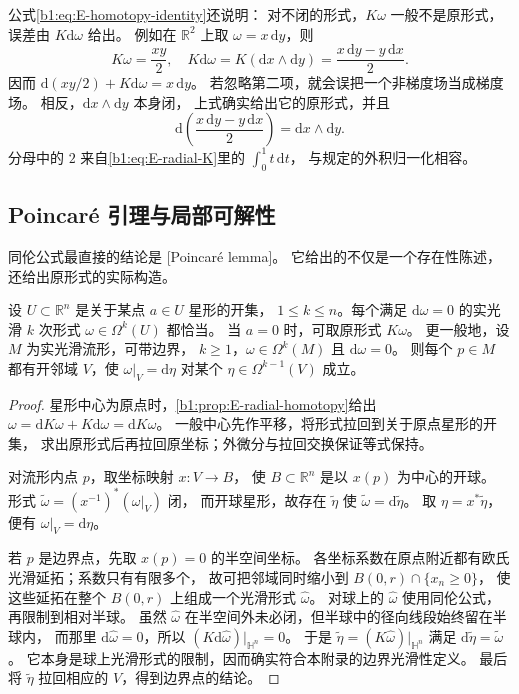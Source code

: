 公式\eqref{b1:eq:E-homotopy-identity}还说明：
对不闭的形式，\(K\omega\) 一般不是原形式，误差由 \(K\mathrm d\omega\) 给出。
例如在 \(\mathbb R^2\) 上取 \(\omega=x\,\mathrm dy\)，则
\[
 K\omega=\frac{xy}{2},
 \quad K\mathrm d\omega
 =K(\mathrm dx\wedge\mathrm dy)
 =\frac{x\,\mathrm dy-y\,\mathrm dx}{2}.
\]
因而 \(\mathrm d(xy/2)+K\mathrm d\omega=x\,\mathrm dy\)。
若忽略第二项，就会误把一个非梯度场当成梯度场。
相反，\(\mathrm dx\wedge\mathrm dy\) 本身闭，
上式确实给出它的原形式，并且
\[
 \mathrm d\!\left(\frac{x\,\mathrm dy-y\,\mathrm dx}{2}\right)
 =\mathrm dx\wedge\mathrm dy.
\]
分母中的 \(2\) 来自\eqref{b1:eq:E-radial-K}里的 \(\int_0^1t\,\mathrm dt\)，
与规定的外积归一化相容。

\subsection{Poincaré 引理与局部可解性}
\label{b1:subsec:E10503}

同伦公式最直接的结论是
[Poincaré lemma]。
它给出的不仅是一个存在性陈述，还给出原形式的实际构造。

\begin{theorem}[Poincaré 引理]\label{b1:thm:E-poincare}
设 \(U\subset\mathbb R^n\) 是关于某点 \(a\in U\) 星形的开集，
\(1\leq k\leq n\)。每个满足 \(\mathrm d\omega=0\) 的实光滑
\(k\) 次形式 \(\omega\in\Omega^k(U)\) 都恰当。
当 \(a=0\) 时，可取原形式 \(K\omega\)。
更一般地，设 \(M\) 为实光滑流形，可带边界，
\(k\geq1\)，\(\omega\in\Omega^k(M)\) 且 \(\mathrm d\omega=0\)。
则每个 \(p\in M\) 都有开邻域 \(V\)，使
\(\omega|_V=\mathrm d\eta\) 对某个 \(\eta\in\Omega^{k-1}(V)\) 成立。
\end{theorem}
\begin{proof}
星形中心为原点时，\cref{b1:prop:E-radial-homotopy}给出
\(\omega=\mathrm dK\omega+K\mathrm d\omega=\mathrm dK\omega\)。
一般中心先作平移，将形式拉回到关于原点星形的开集，
求出原形式后再拉回原坐标；外微分与拉回交换保证等式保持。

对流形内点 \(p\)，取坐标映射 \(x:V\rightarrow B\)，
使 \(B\subset\mathbb R^n\) 是以 \(x(p)\) 为中心的开球。
形式 \(\widetilde\omega=(x^{-1})^*(\omega|_V)\) 闭，
而开球星形，故存在 \(\widetilde\eta\) 使
\(\widetilde\omega=\mathrm d\widetilde\eta\)。
取 \(\eta=x^*\widetilde\eta\)，便有 \(\omega|_V=\mathrm d\eta\)。

若 \(p\) 是边界点，先取 \(x(p)=0\) 的半空间坐标。
各坐标系数在原点附近都有欧氏光滑延拓；系数只有有限多个，
故可把邻域同时缩小到 \(B(0,r)\cap\{x_n\geq0\}\)，
使这些延拓在整个 \(B(0,r)\) 上组成一个光滑形式 \(\widehat\omega\)。
对球上的 \(\widehat\omega\) 使用同伦公式，再限制到相对半球。
虽然 \(\widehat\omega\) 在半空间外未必闭，但半球中的径向线段始终留在半球内，
而那里 \(\mathrm d\widehat\omega=0\)，所以
\((K\mathrm d\widehat\omega)|_{\mathbb H^n}=0\)。
于是 \(\widetilde\eta=(K\widehat\omega)|_{\mathbb H^n}\) 满足
\(\mathrm d\widetilde\eta=\widetilde\omega\)。
它本身是球上光滑形式的限制，因而确实符合本附录的边界光滑性定义。
最后将 \(\widetilde\eta\) 拉回相应的 \(V\)，得到边界点的结论。
\end{proof}

